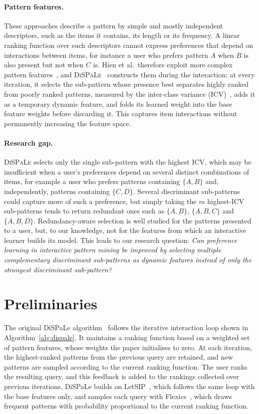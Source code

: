 \documentclass[sigconf]{acmart}
\begin{document}
\paragraph{Pattern features.}
These approaches describe a pattern by simple and mostly independent descriptors, such as the items it contains, its length or its frequency. A linear ranking function over such descriptors cannot express preferences that depend on interactions between items, for instance a user who prefers pattern $A$ when $B$ is also present but not when $C$ is. Hien et al.\ therefore exploit more complex pattern features~\cite{hien2022}, and \textsc{DiSPaLe}~\cite{hien2023} constructs them during the interaction: at every iteration, it selects the sub-pattern whose presence best separates highly ranked from poorly ranked patterns, measured by the inter-class variance (ICV)~\cite{morishita2000}, adds it as a temporary dynamic feature, and folds its learned weight into the base feature weights before discarding it. This captures item interactions without permanently increasing the feature space.

\paragraph{Research gap.}
\textsc{DiSPaLe} selects only the single sub-pattern with the highest ICV, which may be insufficient when a user's preferences depend on several distinct combinations of items, for example a user who prefers patterns containing $\{A,B\}$ and, independently, patterns containing $\{C,D\}$. Several discriminant sub-patterns could capture more of such a preference, but simply taking the $m$ highest-ICV sub-patterns tends to return redundant ones such as $\{A,B\}$, $\{A,B,C\}$ and $\{A,B,D\}$. Redundancy-aware selection is well studied for the patterns presented to a user, but, to our knowledge, not for the features from which an interactive learner builds its model. This leads to our research question: \emph{Can preference learning in interactive pattern mining be improved by selecting multiple complementary discriminant sub-patterns as dynamic features instead of only the strongest discriminant sub-pattern?}

\section{Preliminaries}
The original DiSPaLe algorithm~\cite{hien2023} follows the iterative interaction loop shown in Algorithm~\ref{alg:dispale}. It maintains a ranking function based on a weighted set of pattern features, whose weights the paper initialises to zero. At each iteration, the highest-ranked patterns from the previous query are retained, and new patterns are sampled according to the current ranking function. The user ranks the resulting query, and this feedback is added to the rankings collected over previous iterations. DiSPaLe builds on LetSIP~\cite{dzyuba2017}, which follows the same loop with the base features only, and samples each query with Flexics~\cite{dzyuba2017}, which draws frequent patterns with probability proportional to the current ranking function. 
\end{document}
